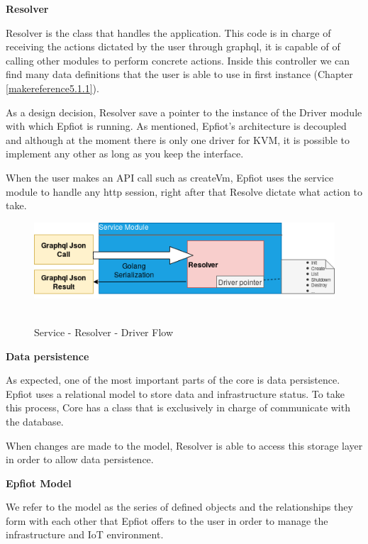 \textbf{Resolver}

Resolver is the class that handles the application. This code is in charge of receiving the actions dictated by the user through graphql, it is capable of of calling other modules to perform concrete actions. Inside this controller we can find many data definitions that the user is able to use in first instance (Chapter \ref{makereference5.1.1}).

As a design decision, Resolver save a pointer to the instance of the Driver module with which Epfiot is running.
As mentioned, Epfiot's architecture is decoupled and although at the moment there is only one driver for KVM, it is possible to implement any other as long as you keep the interface.


When the user makes an API call such as createVm, Epfiot uses the service module to handle any http session, right after that Resolve dictate what action to take.

\begin{figure}[h!]%
\centering
    \includegraphics[width=5.0in]{figures/resolver.png}
~\caption{Service - Resolver - Driver Flow}
\label{figure4.5}
\end{figure}

\textbf{Data persistence}

As expected, one of the most important parts of the core is data persistence. Epfiot uses a relational model to store data and infrastructure status. To take this process, Core has a class that is exclusively in charge of communicate with the database.

When changes are made to the model, Resolver is able to access this storage layer in order to allow data persistence.

\textbf{Epfiot Model}

We refer to the model as the series of defined objects and the relationships they form with each other that Epfiot offers to the user in order to manage the infrastructure and IoT environment.

